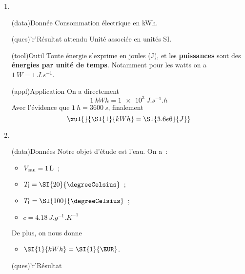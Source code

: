 \documentclass[../main/main.tex]{subfiles}
\begin{document}
{
	\begin{enumerate}
		\item ~
		      \begin{tcbraster}[raster columns=2]
			      \begin{tcb}(data){Donnée}
				      Consommation électrique en \si{kWh}.
			      \end{tcb}
			      \begin{tcb}(ques)'r'{Résultat attendu}
				      Unité associée en unités SI.
			      \end{tcb}
		      \end{tcbraster}
		      \begin{tcb}(tool){Outil}
			      Toute énergie s'exprime en joules (J), et les \textbf{puissances}
			      sont des \textbf{énergies par unité de temps}. Notamment pour les
			      watts on a $\SI{1}{W} = \SI{1}{J.s^{-1}}$.
		      \end{tcb}
		      \begin{tcb}(appl){Application}
			      On a directement
			      \[ \SI{1}{kWh} = \SI{1e3}{J.s^{-1}.h}\]
			      Avec l'évidence que $ \SI{1}{h} = \SI{3600}{s}$, finalement
			      \[\xul{}{\SI{1}{kWh} = \SI{3.6e6}{J}}\]
		      \end{tcb}
		\item ~
		      \begin{tcbraster}[raster columns=2, raster equal height=rows]
			      \begin{tcb}(data){Données}
				      Notre objet d'étude est l'eau. On a~:
				      \begin{itemize}
					      \item $V_{\rm eau} = \SI{1}{L}$~;
					      \item $T_{\rm i} = \SI{20}{\degreeCelsius}$~;
					      \item $T_{\rm f} = \SI{100}{\degreeCelsius}$~;
					      \item $c = \SI{4.18}{J.g^{-1}.K^{-1}}$
				      \end{itemize}
				      De plus, on nous donne
				      \begin{itemize}
					      \item $ \SI{1}{kWh} = \SI{1}{\EUR}$.
				      \end{itemize}
			      \end{tcb}
			      \begin{tcolorbox}[blankest, raster multicolumn=1, space to=\myspace]
				      \begin{tcbraster}[raster columns=1]
					      \begin{tcb}[add to natural height=\myspace](ques)'r'{Résultat
}
\end{tcb}
\end{tcbraster}
\end{tcolorbox}
\end{tcbraster}
\end{enumerate}}
\end{document}
